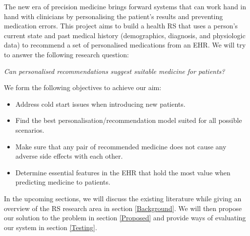 \label{AimObjectives}
The new era of precision medicine brings forward systems that can work
hand in hand with clinicians by personalising the patient's results and
preventing medication errors. This project aims to build a health RS that
uses a person's current state and past medical history (demographics,
diagnosis, and physiologic data) to recommend a set of personalised
medications from an EHR. We will try to answer the following research
question:

\begin{center}
    \textit{
        Can personalised recommendations suggest suitable
        medicine for patients?
    }
\end{center}


We form the following objectives to achieve our aim:

\begin{itemize}

    \item Address cold start issues when introducing new patients.

     \item Find the best personalisation/recommendation
         model suited for all possible scenarios.

    \item Make sure that any pair of recommended medicine does not
        cause any adverse side effects with each other.

    \item 
        Determine essential features in the EHR that hold the most value
        when predicting medicine to patients.

\end{itemize}


In the upcoming sections, we will discuss the existing
literature while giving an overview of the RS research
area in section \ref{Background}. We will then propose our solution to
the problem in section \ref{Proposed} and provide ways of evaluating
our system in section \ref{Testing}. 
